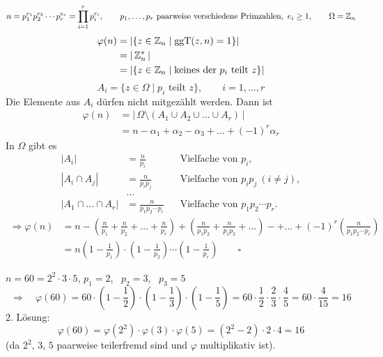 \begin{satz}
\[
n = p_1^{e_1} p_2^{e_2} \cdots p_r^{e_r} = \prod_{i=1}^{r} p_i^{e_i}, \qquad p_1, \dots, p_r \text{ paarweise verschiedene Primzahlen}, \ e_i \ge 1, \qquad \Omega = \mathbb{Z}_n
\]
\begin{align*}
\varphi(n) &= |\{ z \in \mathbb{Z}_n \mid \operatorname{ggT}(z, n) = 1 \}| \\
&= |\,\mathbb{Z}_n^*\,| \\
&= |\{ z \in \mathbb{Z}_n \mid \text{keines der } p_i \text{ teilt } z \}|
\end{align*}
\[
A_i = \{ z \in \Omega \mid p_i \text{ teilt } z \}, \qquad i = 1, \dots, r
\]
Die Elemente aus $A_i$ dürfen nicht mitgezählt werden. Dann ist
\begin{align*}
\varphi(n) &= |\,\Omega \setminus (A_1 \cup A_2 \cup \dots \cup A_r)\,| \\
&= n - \alpha_1 + \alpha_2 - \alpha_3 + \dots + (-1)^r \alpha_r
\end{align*}
In $\Omega$ gibt es
\begin{align*}
|A_i| &= \frac{n}{p_i} && \text{Vielfache von } p_i, \\
|A_i \cap A_j| &= \frac{n}{p_i p_j} && \text{Vielfache von } p_i p_j \ (i \neq j), \\
&\dots \\
|A_1 \cap \dots \cap A_r| &= \frac{n}{p_1 p_2 \cdots p_r} && \text{Vielfache von } p_1 p_2 \cdots p_r.
\end{align*}
\begin{align*}
\Rightarrow \varphi(n) &= n - \left(\frac{n}{p_1} + \frac{n}{p_2} + \dots + \frac{n}{p_r}\right) + \left(\frac{n}{p_1p_2} + \frac{n}{p_1p_3} + \dots\right) - + \dots + (-1)^r\left(\frac{n}{p_1p_2\cdots p_r}\right) \\
&= n \left(1 - \frac{1}{p_1}\right)\cdot\left(1 - \frac{1}{p_2}\right)\cdots\left(1 - \frac{1}{p_r}\right) \qquad \square
\end{align*}
\end{satz}

\begin{beispiel}
$n = 60 = 2^2 \cdot 3 \cdot 5$, \qquad $p_1 = 2$, \ $p_2 = 3$, \ $p_3 = 5$
\[
\Rightarrow \quad %
\varphi(60) = 60 \cdot \left(1 - \frac{1}{2}\right)\cdot\left(1 - \frac{1}{3}\right)\cdot\left(1 - \frac{1}{5}\right) = 60 \cdot \frac{1}{2}\cdot\frac{2}{3}\cdot\frac{4}{5} = 60 \cdot \frac{4}{15} = 16
\]
2. Lösung:
\[
\varphi(60) = \varphi(2^2) \cdot \varphi(3) \cdot \varphi(5) = (2^2 - 2) \cdot 2 \cdot 4 = 16
\]
(da $2^2$, $3$, $5$ paarweise teilerfremd sind und $\varphi$ multiplikativ ist).
\end{beispiel}

